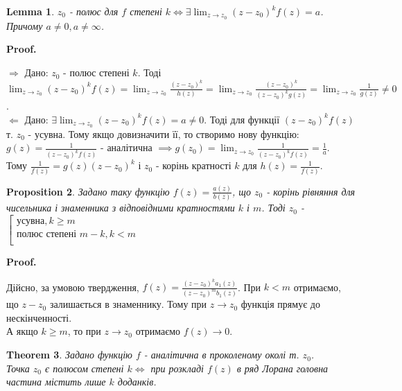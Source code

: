 \documentclass[a4paper, 10pt]{article}
\makeatletter
\def\qed{$\blacksquare$}
\theoremstyle{theoremdd}
\newtheorem{theorem}{Theorem}[subsection]
\theoremstyle{theoremdd}
\theoremstyle{theoremdd}
\theoremstyle{theoremdd}
\theoremstyle{theoremdd}
\newtheorem{proposition}[theorem]{Proposition}
\theoremstyle{theoremdd}
\theoremstyle{theoremdd}
\newtheorem{lemma}[theorem]{Lemma}
\theoremstyle{theoremdd}
\renewenvironment{proof}[1][Proof.\\]{\par
\pushQED{\hfill \qed}%
\normalfont \topsep6\p@\@plus6\p@\relax
\trivlist
\item\relax
{\bfseries
#1\@addpunct{.}}\hspace\labelsep\ignorespaces
}{%
\popQED\endtrivlist\@endpefalse
}
\makeatother
\begin{document}
\begin{lemma}
$z_0$ - полюс для $f$ степені $k \iff \exists \displaystyle \lim_{z \to z_0} (z-z_0)^k f(z) = a$. Причому $a \neq 0, a \ne \infty$.
\end{lemma}

\begin{proof}
$\boxed{\Rightarrow} $ Дано: $z_0$ - полюс степені $k$. Тоді \\
$\displaystyle \lim_{z \to z_0} (z-z_0)^k f(z) = \lim_{z \to z_0} \frac{(z-z_0)^k}{h(z)} = \lim_{z \to z_0} \frac{(z-z_0)^k}{(z-z_0)^k g(z)} = \lim_{z \to z_0} \frac{1}{g(z)} \neq 0$.
	 \bigskip \\
 $\boxed{\Leftarrow} $ Дано: $\exists \displaystyle \lim_{z \to z_0} (z-z_0)^k f(z) = a \neq 0$. Тоді для функції $(z-z_0)^k f(z)$ т. $z_0$ - усувна. Тому якщо довизначити її, то створимо нову функцію:\\
	 $\displaystyle g(z) = \frac{1}{(z-z_0)^k f(z)}$ - аналітична  $\displaystyle \implies g(z_0)=\lim_{z \to z_0} \frac{1}{(z-z_0)^k f(z)} = \frac{1}{a}$.\\
	 Тому  $\displaystyle\frac{1}{f(z)}=g(z)(z-z_0)^k$ і $z_0$ - корінь кратності $k$ для $h(z)=\displaystyle \frac{1}{f(z)}$.
\end{proof}

\begin{proposition}
Задано таку функцію $\displaystyle f(z)=\frac{a(z)}{b(z)}$, що $z_0$ - корінь рівняння для чисельника і знаменника з відповідними кратностями $k$ і $m$. Тоді $z_0$ - $\left[
  \begin{array}{ccc}
     \textrm{усувна}, k \geq m \\
     \textrm{полюс степені  } m-k, k < m \\
  \end{array}
\right.$
\end{proposition}

\begin{proof}
Дійсно, за умовою твердження, $\displaystyle f(z)=\frac{(z-z_0)^k a_1(z)}{(z-z_0)^m b_1(z)}$. При $k<m$ отримаємо, що $z-z_0$ залишається в знаменнику. Тому при $z\to z_0$ функція прямує до нескінченності.\\
А якщо $k \geq m$, то при $z \to z_0$ отримаємо $f(z) \to 0$.
\end{proof}

\begin{theorem}
Задано функцію $f$ - аналітична в проколеному околі т. $z_0$.\\
Точка $z_0$ є полюсом степені $k \iff$ при розкладі $f(z)$ в ряд Лорана головна частина містить лише $k$ доданків.
\end{theorem}
\end{document}

